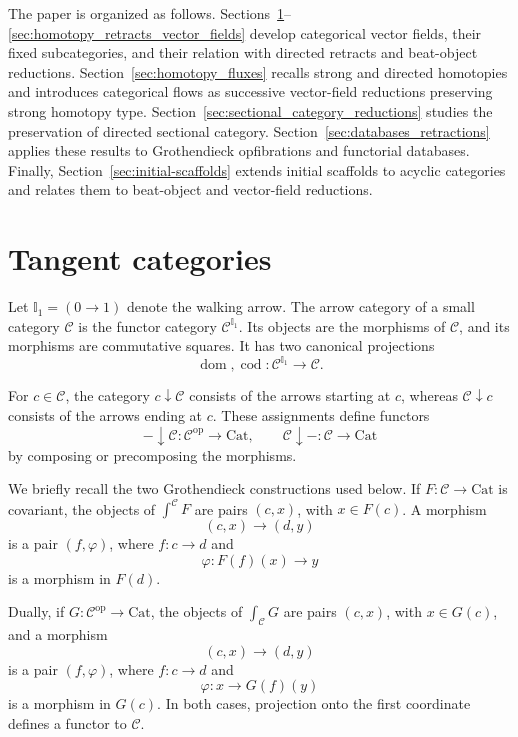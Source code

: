 \documentclass[12pt]{amsart}
\theoremstyle{definition}
\theoremstyle{remark}
\numberwithin{figure}{section}%
\newcommand{\CC}{\mathcal{C}}
\newcommand{\op}{\mathrm{op}}
\newcommand{\Cat}{\mathrm{Cat}}
\begin{document}
The paper is organized as follows. Sections~\ref{sec:tangent_category}--\ref{sec:homotopy_retracts_vector_fields} develop categorical vector fields, their fixed subcategories, and their relation with directed retracts and beat-object reductions. Section~\ref{sec:homotopy_fluxes} recalls strong and directed homotopies and introduces categorical flows as successive vector-field reductions preserving strong homotopy type.  Section~\ref{sec:sectional_category_reductions} studies the preservation of directed sectional category. Section~\ref{sec:databases_retractions} applies these results to Grothendieck opfibrations and functorial databases. Finally, Section~\ref{sec:initial-scaffolds} extends initial scaffolds to acyclic categories and relates them to beat-object and vector-field reductions.

\section{Tangent categories}
\label{sec:tangent_category}

Let \(\mathbb I_1=(0\to1)\) denote the walking arrow. The arrow category
of a small category \(\CC\) is the functor category
\(\CC^{\mathbb I_1}\). Its objects are the morphisms of \(\CC\), and its
morphisms are commutative squares. It has two canonical projections
\[
\operatorname{dom},\operatorname{cod}
\colon
\CC^{\mathbb I_1}\longrightarrow\CC.
\]

For \(c\in\CC\), the category \(c\downarrow\CC\) consists of the arrows
starting at \(c\), whereas \(\CC\downarrow c\) consists of the arrows
ending at \(c\). These assignments define functors
\[
-\downarrow\CC\colon\CC^{\op}\longrightarrow\Cat,
\qquad
\CC\downarrow-\colon\CC\longrightarrow\Cat
\]
by composing or precomposing the morphisms.

We briefly recall the two Grothendieck constructions used below. If
\(F\colon\CC\to\Cat\) is covariant, the objects of
\(\int^\CC F\) are pairs \((c,x)\), with \(x\in F(c)\). A morphism
\[
(c,x)\longrightarrow(d,y)
\]
is a pair \((f,\varphi)\), where \(f\colon c\to d\) and
\[
\varphi\colon F(f)(x)\longrightarrow y
\]
is a morphism in \(F(d)\).

Dually, if \(G\colon\CC^{\op}\to\Cat\), the objects of
\(\int_\CC G\) are pairs \((c,x)\), with \(x\in G(c)\), and a morphism
\[
(c,x)\longrightarrow(d,y)
\]
is a pair \((f,\varphi)\), where \(f\colon c\to d\) and
\[
\varphi\colon x\longrightarrow G(f)(y)
\]
is a morphism in \(G(c)\). In both cases, projection onto the first
coordinate defines a functor to \(\CC\).
\end{document}
